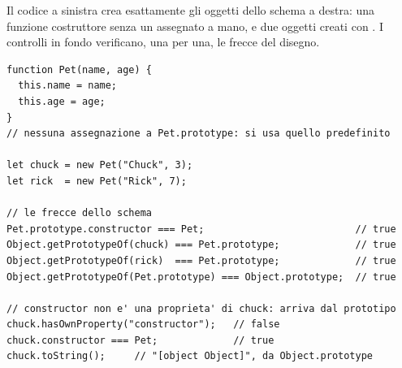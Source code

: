 Il codice a sinistra crea esattamente gli oggetti dello schema a destra: una
funzione costruttore  senza un  assegnato a mano, e due
oggetti creati con . I controlli in fondo verificano, una per una, le
frecce del disegno.

\begin{affianco}[0.55][c]
\codicepiccolo
\begin{lstlisting}[style=js, name=costruttore-predefinito.js]
function Pet(name, age) {
  this.name = name;
  this.age = age;
}
// nessuna assegnazione a Pet.prototype: si usa quello predefinito

let chuck = new Pet("Chuck", 3);
let rick  = new Pet("Rick", 7);

// le frecce dello schema
Pet.prototype.constructor === Pet;                          // true
Object.getPrototypeOf(chuck) === Pet.prototype;             // true
Object.getPrototypeOf(rick)  === Pet.prototype;             // true
Object.getPrototypeOf(Pet.prototype) === Object.prototype;  // true

// constructor non e' una proprieta' di chuck: arriva dal prototipo
chuck.hasOwnProperty("constructor");   // false
chuck.constructor === Pet;             // true
chuck.toString();     // "[object Object]", da Object.prototype
\end{lstlisting}
\risultato
\begin{immagine}
\end{immagine}
\end{affianco}


